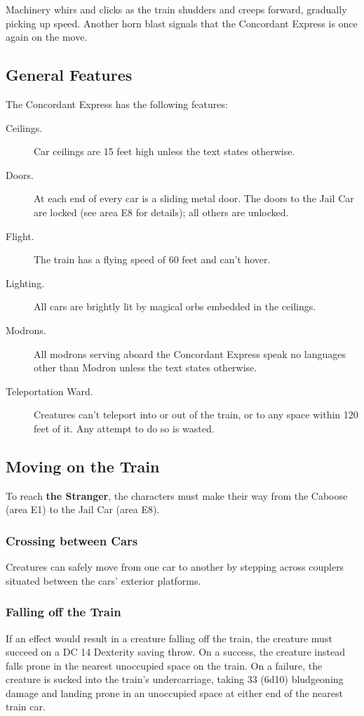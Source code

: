 \documentclass[10pt,a4paper,twoside,bg=print,twocolumn,openany,nodeprecatedcode]{dndbook}
\begin{document}
\begin{DndReadAloud}{}
Machinery whirs and clicks as the train shudders and creeps forward, gradually picking up speed. Another horn blast signals that the Concordant Express is once again on the move.

\end{DndReadAloud}

\subsection{General Features}
The Concordant Express has the following features:


\begin{description}
\item[Ceilings.]
Car ceilings are 15 feet high unless the text states otherwise.
\item[Doors.]
At each end of every car is a sliding metal door. The doors to the Jail Car are locked (see area E8 for details); all others are unlocked.
\item[Flight.]
The train has a flying speed of 60 feet and can't hover.
\item[Lighting.]
All cars are brightly lit by magical orbs embedded in the ceilings.
\item[Modrons.]
All modrons serving aboard the Concordant Express speak no languages other than Modron unless the text states otherwise.
\item[Teleportation Ward.]
Creatures can't teleport into or out of the train, or to any space within 120 feet of it. Any attempt to do so is wasted.
\end{description}

\subsection{Moving on the Train}
To reach \textbf{the Stranger}, the characters must make their way from the Caboose (area E1) to the Jail Car (area E8).

\subsubsection{Crossing between Cars}
Creatures can safely move from one car to another by stepping across couplers situated between the cars' exterior platforms.

\subsubsection{Falling off the Train}
If an effect would result in a creature falling off the train, the creature must succeed on a DC 14 Dexterity saving throw. On a success, the creature instead falls prone in the nearest unoccupied space on the train. On a failure, the creature is sucked into the train's undercarriage, taking 33 (6d10) bludgeoning damage and landing prone in an unoccupied space at either end of the nearest train car.
\end{document}

